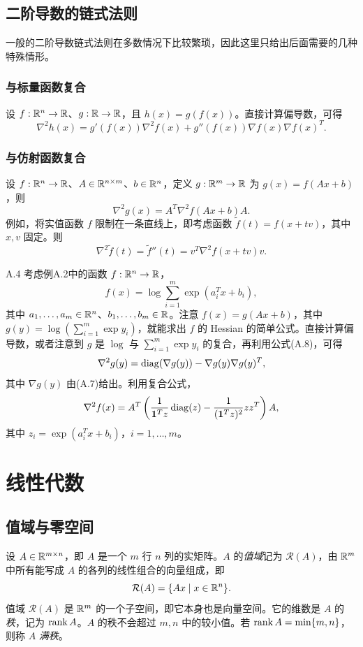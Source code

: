 \subsection{二阶导数的链式法则}
一般的二阶导数链式法则在多数情况下比较繁琐，因此这里只给出后面需要的几种特殊情形。

\subsubsection*{与标量函数复合}
设 $f:\mathbb R^n\to\mathbb R$、$g:\mathbb R\to\mathbb R$，且 $h(x)=g(f(x))$。直接计算偏导数，可得
\begin{equation}
 \nabla^2h(x)=g'(f(x))\nabla^2f(x)+g''(f(x))\nabla f(x)\nabla f(x)^T.\tag{A.8}
\end{equation}

\subsubsection*{与仿射函数复合}
设 $f:\mathbb R^n\to\mathbb R$、$A\in\mathbb R^{n\times m}$、$b\in\mathbb R^n$，定义 $g:\mathbb R^m\to\mathbb R$ 为 $g(x)=f(Ax+b)$，则
\[
 \nabla^2g(x)=A^T\nabla^2f(Ax+b)A.
\]
例如，将实值函数 $f$ 限制在一条直线上，即考虑函数 $\widetilde f(t)=f(x+tv)$，其中 $x,v$ 固定。则
\[
 \nabla^2\widetilde f(t)=\widetilde f''(t)=v^T\nabla^2f(x+tv)v.
\]

\begin{origexample}{A.4}
考虑例A.2中的函数 $f:\mathbb R^n\to\mathbb R$，
\[
 f(x)=\log\sum_{i=1}^m\exp(a_i^Tx+b_i),
\]
其中 $a_1,\ldots,a_m\in\mathbb R^n$、$b_1,\ldots,b_m\in\mathbb R$。注意 $f(x)=g(Ax+b)$，其中 $g(y)=\log(\sum_{i=1}^m\exp y_i)$，就能求出 $f$ 的 Hessian 的简单公式。直接计算偏导数，或者注意到 $g$ 是 $\log$ 与 $\sum_{i=1}^m\exp y_i$ 的复合，再利用公式(A.8)，可得
\[
 \nabla^2g(y)=\operatorname{diag}(\nabla g(y))-\nabla g(y)\nabla g(y)^T,
\]
其中 $\nabla g(y)$ 由(A.7)给出。利用复合公式，
\[
 \nabla^2f(x)=A^T\left(\frac1{\mathbf 1^Tz}\operatorname{diag}(z)-\frac1{(\mathbf 1^Tz)^2}zz^T\right)A,
\]
其中 $z_i=\exp(a_i^Tx+b_i)$，$i=1,\ldots,m$。
\end{origexample}

\section{线性代数}
\subsection{值域与零空间}
设 $A\in\mathbb R^{m\times n}$，即 $A$ 是一个 $m$ 行 $n$ 列的实矩阵。$A$ 的\emph{值域}记为 $\mathcal R(A)$，由 $\mathbb R^m$ 中所有能写成 $A$ 的各列的线性组合的向量组成，即
\[
 \mathcal R(A)=\{Ax\mid x\in\mathbb R^n\}.
\]
值域 $\mathcal R(A)$ 是 $\mathbb R^m$ 的一个子空间，即它本身也是向量空间。它的维数是 $A$ 的\emph{秩}，记为 $\operatorname{rank} A$。$A$ 的秩不会超过 $m,n$ 中的较小值。若 $\operatorname{rank} A=\min\{m,n\}$，则称 $A$ \emph{满秩}。

